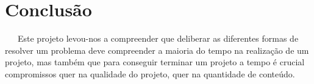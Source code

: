 \documentclass[a4paper]{report} %
\begin{document}
\chapter{Conclusão}

    \Par \ \ \ Este projeto levou-nos a compreender que deliberar as diferentes formas de resolver um problema deve compreender a maioria do tempo na realização de um projeto, mas também que para conseguir terminar um projeto a tempo é crucial compromissos quer na qualidade do projeto, quer na quantidade de conteúdo. 


    
\end{document}

